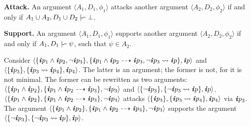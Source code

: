 \documentclass[10pt, conference, compsocconf]{IEEEtran}
\begin{document}

\begin{definition}\label{def:attack}
	\textbf{Attack.} An argument $\langle A_{1}, D_{1}, \phi_{1} \rangle$ attacks another argument $\langle A_{2}, D_{2}, \phi_{2} \rangle$ if and only if $A_{1} \cup A_{2}, D_{1} \cup D_{2} \mid\negthinspace\backsim \bot$.
\end{definition}

\begin{definition}\label{def:support}
\textbf{Support.} An argument $\langle A_{1}, D_{1}, \phi_{1} \rangle$ supports another argument $\langle A_{2}, D_{2}, \phi_{2} \rangle$ if and only if $A_{1}, D_{1} \mid\negthinspace\backsim \psi$, such that $\psi \in A_{2}$. 
\end{definition}

\begin{example}\label{ex:attack-support}
Consider $\langle \{ \textbf{\textit{i}}p_{1} \wedge \textbf{\textit{i}}p_{2}, \neg\textbf{\textit{i}}p_{3} \}, \{ \textbf{\textit{i}}p_{1} \wedge \textbf{\textit{i}}p_{2} \dashrightarrow \textbf{\textit{i}}p_{3}, \neg\textbf{\textit{i}}p_{3} \rightsquigarrow \textbf{\textit{i}}p \}, \textbf{\textit{i}}p \rangle$ and $\langle \{ \textbf{\textit{i}}p_{3} \}, \{ \textbf{\textit{i}}p_{3} \rightsquigarrow \textbf{\textit{i}}p_{4} \}, \textbf{\textit{i}}p_{4} \rangle$. The latter is an argument; the former is not, for it is not minimal. The former can be rewritten as two arguments: $\langle \{ \textbf{\textit{i}}p_{1} \wedge \textbf{\textit{i}}p_{2} \}, \{ \textbf{\textit{i}}p_{1} \wedge \textbf{\textit{i}}p_{2} \dashrightarrow \textbf{\textit{i}}p_{3} \}, \neg\textbf{\textit{i}}p_{3} \rangle$ and $\langle \{ \neg\textbf{\textit{i}}p_{3} \}, \{ \neg\textbf{\textit{i}}p_{3} \rightsquigarrow \textbf{\textit{i}}p \}, \textbf{\textit{i}}p \rangle$. $\langle \{ \textbf{\textit{i}}p_{1} \wedge \textbf{\textit{i}}p_{2} \}, \{ \textbf{\textit{i}}p_{1} \wedge \textbf{\textit{i}}p_{2} \dashrightarrow \textbf{\textit{i}}p_{3} \}, \neg\textbf{\textit{i}}p_{3} \rangle$ attacks $\langle \{ \textbf{\textit{i}}p_{3} \}, \{ \textbf{\textit{i}}p_{3} \rightsquigarrow \textbf{\textit{i}}p_{4} \}, \textbf{\textit{i}}p_{4} \rangle$ via $\textbf{\textit{i}}p_{3}$. The argument $\langle \{ \textbf{\textit{i}}p_{1} \wedge \textbf{\textit{i}}p_{2} \}, \{ \textbf{\textit{i}}p_{1} \wedge \textbf{\textit{i}}p_{2} \dashrightarrow \textbf{\textit{i}}p_{3} \}, \neg\textbf{\textit{i}}p_{3} \rangle$ supports the argument $\langle \{ \neg\textbf{\textit{i}}p_{3} \}, \{ \neg\textbf{\textit{i}}p_{3} \rightsquigarrow \textbf{\textit{i}}p \}, \textbf{\textit{i}}p \rangle$.
\end{example}
\end{document}
